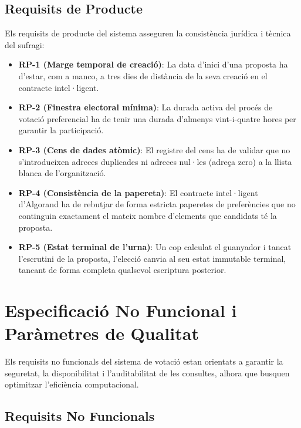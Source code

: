 \subsection{Requisits de Producte}
\label{subsec:requisits-producte}

Els requisits de producte del sistema asseguren la consistència jurídica i tècnica del sufragi:

\begin{itemize}
    \item \textbf{RP-1 (Marge temporal de creació)}: La data d'inici d'una proposta ha d'estar, com a manco, a tres dies
    de distància de la seva creació en el contracte intel·ligent.

    \item \textbf{RP-2 (Finestra electoral mínima)}: La durada activa del procés de votació preferencial ha de tenir una
    durada d'almenys vint-i-quatre hores per garantir la participació.

    \item \textbf{RP-3 (Cens de dades atòmic)}: El registre del cens ha de validar que no s'introdueixen adreces
    duplicades ni adreces nul·les (adreça zero) a la llista blanca de l'organització.

    \item \textbf{RP-4 (Consistència de la papereta)}: El contracte intel·ligent d'Algorand ha de rebutjar de forma
    estricta paperetes de preferències que no continguin exactament el mateix nombre d'elements que candidats té la
    proposta.

    \item \textbf{RP-5 (Estat terminal de l'urna)}: Un cop calculat el guanyador i tancat l'escrutini de la proposta,
    l'elecció canvia al seu estat immutable terminal, tancant de forma completa qualsevol escriptura posterior.
\end{itemize}


\section{Especificació No Funcional i Paràmetres de Qualitat}
\label{sec:especificacio-no-funcional}

Els requisits no funcionals del sistema de votació estan orientats a garantir la seguretat, la disponibilitat i
l'auditabilitat de les consultes, alhora que busquen optimitzar l'eficiència computacional.

\subsection{Requisits No Funcionals}\label{subsec:requisits-no-funcionals}

